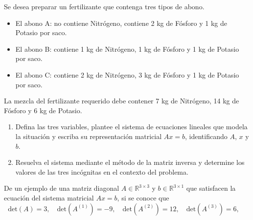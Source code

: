 \documentclass[10pt,a4]{examenEPN0}
\begin{document}
\encabezado
{}
\indicacionesPrueba



\begin{preguntas}



\item Se desea preparar un fertilizante que contenga tres tipos de abono. 

\begin{itemize}
\item El abono A: no contiene Nitrógeno,
contiene 2 kg de Fósforo y 1 kg de Potasio por saco. 
\item El abono B: contiene 1 kg de Nitrógeno, 1 kg de Fósforo y 1 kg de Potasio por saco. 
\item El abono C: contiene 2 kg de Nitrógeno, 3 kg de Fósforo y 1 kg de Potasio por saco. 
\end{itemize}
La mezcla del fertilizante requerido debe contener 7 kg de Nitrógeno, 14 kg de Fósforo y 6 kg de Potasio.

\begin{enumerate}
\item Defina las tres variables, plantee el sistema de ecuaciones lineales que modela la situación y escriba su representación matricial $Ax=b$, identificando $A$, $x$ y $b$. 
\item Resuelva el sistema mediante el método de la matriz inversa y determine los valores de las tres incógnitas en el contexto del problema. 
\end{enumerate}

\item De un ejemplo de una matriz diagonal $A\in \mathbb{R}^{3\times 3}$ y $b\in \mathbb{R}^{3\times 1}$ que satisfacen la ecuación del sistema matricial $Ax= b$, si se conoce que 
        \[
            \mathrm{det}(A) = 3,
            \quad 
            \mathrm{det}(A^{(1)}) = -9, 
            \quad
            \mathrm{det}(A^{(2)}) = 12, 
            \quad
            \mathrm{det}(A^{(3)}) = 6, 
            \quad
        \]
        

\end{preguntas}
\end{document}
